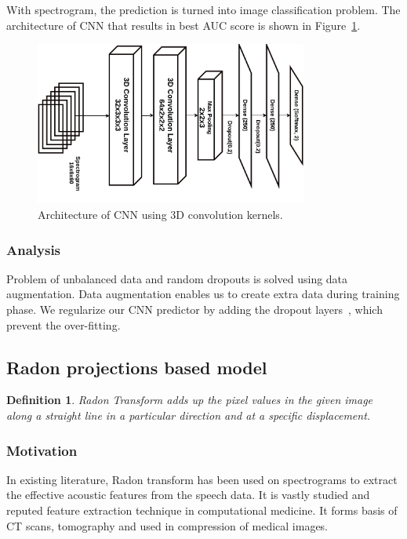 \documentclass[letterpaper,12pt]{article}
\newtheorem{definition}{Definition}[section]
\begin{document}
With spectrogram, the prediction is turned into image classification problem. The architecture
of CNN that results in best AUC score is shown in Figure~\ref{fig:cnn}.

\begin{figure}[h]
  \centering
    \includegraphics[width=0.8\textwidth]{images/cnn.png}
  \caption{Architecture of CNN using 3D convolution kernels.}
  \label{fig:cnn}
\end{figure}


\subsubsection{Analysis}
Problem of unbalanced data and random dropouts is solved using data
augmentation. Data augmentation enables us to create extra data during training
phase. We regularize our CNN predictor by adding the dropout
layers~\cite{srivastava2014dropout}, which prevent the over-fitting.


\subsection{Radon projections based model}

\begin{definition}{Radon Transform} adds up the pixel values in the given image
  along a straight line in a particular direction and at a specific displacement.
\end{definition}

\subsubsection{Motivation}
In existing literature, Radon transform has been used on spectrograms to extract
the effective acoustic features from the speech
data\cite{ajmera_text-independent_2011-2}. It is vastly studied and
reputed feature extraction technique in computational
medicine. It forms basis of CT scans, tomography
and used in compression of medical images.
\end{document}
